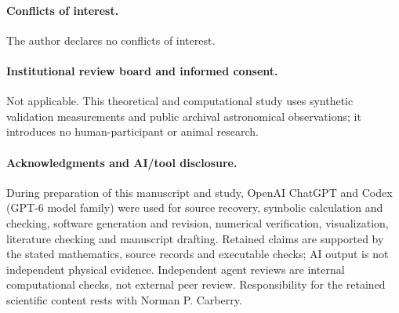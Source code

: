 \documentclass[11pt,a4paper]{article}
\begin{document}
\paragraph{Conflicts of interest.}
The author declares no conflicts of interest.

\paragraph{Institutional review board and informed consent.}
Not applicable. This theoretical and computational study uses synthetic
validation measurements and public archival astronomical observations;
it introduces no human-participant or animal research.

\paragraph{Acknowledgments and AI/tool disclosure.}
During preparation of this manuscript and study, OpenAI ChatGPT and
Codex (GPT-6 model family) were used for source recovery, symbolic
calculation and checking, software generation and revision, numerical
verification, visualization, literature checking and manuscript drafting.
Retained claims are supported by the stated mathematics, source records
and executable checks; AI output is not independent physical evidence.
Independent agent reviews are internal computational checks, not external
peer review. Responsibility for the retained scientific content rests
with Norman P. Carberry.

\appendix


\setlength{\bibsep}{2pt}

\end{document}
